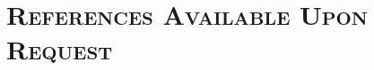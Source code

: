 \documentclass[11pt]{moderncv}
\begin{document}


\section{\textsc{References Available Upon Request}}
\end{document}
